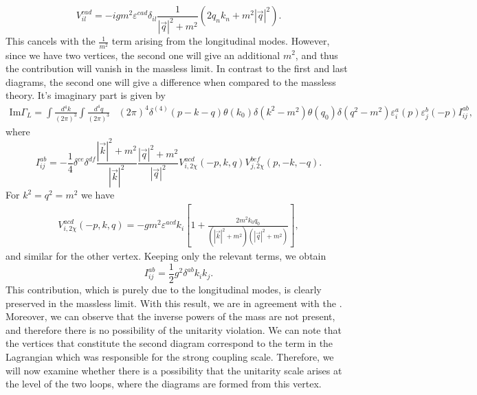 \documentclass{article}
\begin{document}
\begin{equation}
    V_{il}^{cad}=-igm^2\varepsilon^{cad}\delta_{il}\frac{1}{|\vec{q}|^2+m^2}\left(2q_nk_n+m^2|\vec{q}|^2\right).
\end{equation}
This cancels with the $\frac{1}{m^2}$ term arising from the longitudinal modes. However, since we have two vertices, the second one will give an additional $m^2$, and thus the contribution will vanish in the massless limit. 
\newline
In contrast to the first and last diagrams, the second one will give a difference when compared to the massless theory.
It's imaginary part is given by 
\begin{equation}
    \begin{split}
        \text{Im}\Gamma_L=\int\frac{d^4k}{(2\pi)^3}\int\frac{d^4q}{(2\pi)^3}&(2\pi)^4\delta^{(4)}(p-k-q)\theta(k_0)\delta(k^2-m^2)\theta(q_0)\delta(q^2-m^2)\varepsilon^a_{i}(p)\varepsilon_{j}^b(-p)I^{ab}_{ij},
    \end{split}
\end{equation}
where 
\begin{equation}
    I^{ab}_{ij}=-\frac{1}{4}\delta^{ce}\delta^{df}\frac{|\vec{k}|^2+m^2}{|\vec{k}|^2}\frac{|\vec{q}|^2+m^2}{|\vec{q}|^2}V^{acd}_{i,2\chi}(-p,k,q)V^{bef}_{j,2\chi}(p,-k,-q).
\end{equation}
 For $k^2=q^2=m^2$ we have 
\begin{equation}
    \begin{split}
        V^{acd}_{i,2\chi}(-p,k,q)=-gm^2\varepsilon^{acd}k_i\left[1+\frac{2m^2k_0q_0}{(|\vec{k}|^2+m^2)(|\vec{q}|^2+m^2)}\right],
    \end{split}
\end{equation}
and similar for the other vertex. Keeping only the relevant terms, we obtain
\begin{equation}
    I^{ab}_{ij}=\frac{1}{2}g^2\delta^{ab}k_ik_j.
\end{equation}
This contribution, which is purely due to the longitudinal modes, is clearly preserved in the massless limit. With this result, we are in agreement with the \cite{vDVZ}. Moreover, we can observe that the inverse powers of the mass are not present, and therefore there is no possibility of the unitarity violation. We can note that the vertices that constitute the second diagram correspond to the term in the Lagrangian which was responsible for the strong coupling scale. Therefore, we will now examine whether there is a possibility that the unitarity scale arises at the level of the two loops, where the diagrams are formed from this vertex. 
\end{document}
